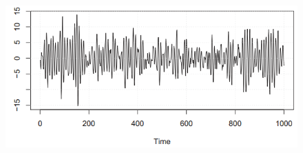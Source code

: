 {\begin{figure}[H]
\begin{minipage}[c]{0.5\textwidth}
		\includegraphics[width=1\linewidth]{images/whNoAR.png}
		\label{Fig:whNoAR}
	\end{minipage}
\end{figure}
}

